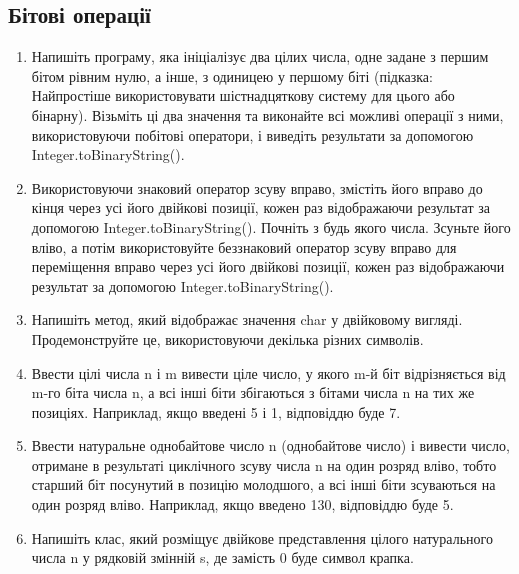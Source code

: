 \documentclass[]{article}
\begin{document}
\subsection{Бітові операції}
\begin{enumerate}
\def\labelenumi{2.\arabic{enumi}.}
\item
Напишіть програму, яка ініціалізує два цілих числа, одне задане з першим бітом рівним нулю, а інше, з одиницею у першому біті (підказка: Найпростіше використовувати шістнадцяткову систему для цього або бінарну). Візьміть ці два значення та виконайте всі
можливі операції з ними, використовуючи побітові оператори, і виведіть результати за допомогою Integer.toBinaryString().
\item
Використовуючи знаковий оператор зсуву вправо, змістіть його вправо до кінця через усі його двійкові позиції, кожен раз відображаючи результат за допомогою Integer.toBinaryString().
 Почніть з будь якого числа. Зсуньте його вліво, а потім використовуйте беззнаковий оператор зсуву вправо для переміщення вправо через усі його двійкові позиції, кожен раз відображаючи результат за допомогою Integer.toBinaryString().
\item
 Напишіть метод, який відображає значення char у двійковому вигляді. Продемонструйте це, використовуючи декілька різних символів.

\item
 Ввести цілі числа n і m вивести ціле число, у якого m-й біт відрізняється від m-го біта числа n, а всі інші біти збігаються з бітами числа n на тих же позиціях. Наприклад, якщо введені 5 і 1, відповіддю буде 7.

\item Ввести натуральне однобайтове число n (однобайтове число) і вивести число, отримане в результаті циклічного зсуву числа n на один розряд вліво, тобто старший біт посунутий в позицію молодшого, а всі інші біти зсуваються на один розряд вліво. Наприклад, якщо введено 130, відповіддю буде 5.

\item
 Напишіть клас, який розміщує двійкове представлення цілого натурального числа n у рядковій змінній s, де замість 0 буде символ крапка. 


\end{enumerate}
\end{document}
